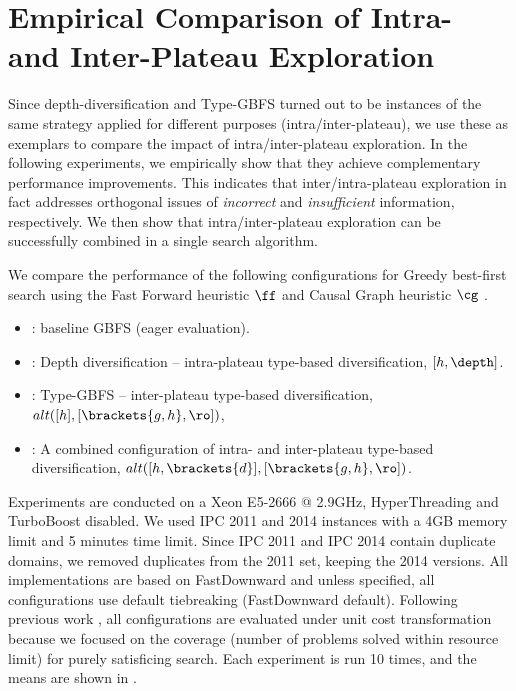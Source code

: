 \section[Empirical Comparison]{Empirical Comparison of Intra- and Inter-Plateau Exploration}
\label{sec:gbfs-comparison}


Since depth-diversification and Type-GBFS turned out to be instances of the same strategy applied for different purposes
(intra/inter-plateau), we use these as exemplars to compare the impact of intra/inter-plateau exploration.
In the following experiments, we empirically show that they achieve complementary performance improvements.
This indicates that inter/intra-plateau exploration in fact addresses orthogonal issues of \emph{incorrect} and \emph{insufficient} information, respectively.
We then show that intra/inter-plateau exploration can be successfully combined in a single search algorithm.

We compare the performance of the following configurations for Greedy best-first search using the Fast Forward heuristic $\ff$ \cite{hoffmann01} and Causal Graph heuristic $\cg$ \cite{Helmert04}.
\begin{itemize}
\item {}: baseline GBFS (eager evaluation).
\item {}: Depth diversification \cite{Asai2016} -- intra-plateau type-based diversification, $[h,\depth]$.
\item {}: Type-GBFS \cite{xie14type} -- inter-plateau type-based diversification,  $alt([h],[\brackets{g,h},\ro])$,
\item  {}: A combined configuration of intra- and inter-plateau type-based diversification, $alt([h,\brackets{d}],[\brackets{g,h},\ro])$.
\end{itemize}

Experiments are conducted on a Xeon E5-2666 @ 2.9GHz, HyperThreading and TurboBoost disabled.
We used IPC 2011 and 2014 instances with a 4GB memory limit and 5 minutes time limit. Since IPC 2011 and IPC 2014 contain duplicate domains, we removed duplicates from the 2011 set, keeping the 2014 versions.
All implementations are based on FastDownward \cite{Helmert2006} and
unless specified, all configurations use \fifo default tiebreaking (FastDownward default).
% 
Following previous work \cite{valenzano2014comparison,xie14type}, all configurations are evaluated under unit cost transformation
because we focused on the coverage (number of problems solved within resource limit) for purely satisficing search. 
Each experiment is run 10 times, and the means are shown in .

